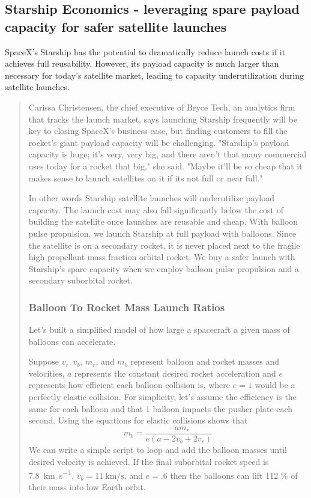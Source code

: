 \documentclass{article}
\begin{document}
\subsection{Starship Economics - leveraging spare payload capacity for safer satellite launches}
SpaceX’s Starship has the potential to dramatically reduce launch costs if it achieves full reusability. However, its payload capacity is much larger than necessary for today’s satellite market, leading to capacity underutilization during satellite launches.   \begin{quote}
Carissa Christensen, the chief executive of Bryce Tech, an analytics firm that tracks the launch market, says launching Starship frequently will be key to closing SpaceX’s business case, but finding customers to fill the rocket’s giant payload capacity will be challenging. 
"Starship's payload capacity is huge; it's very, very big, and there aren't that many commercial uses today for a rocket that big," she said.  "Maybe it'll be so cheap that it makes sense to launch satellites on it if its not full or near full." \cite{nyt_starship_size}

In other words Starship satellite launches will underutilize payload capacity.   The launch cost may also fall significantly below the cost of building the satellite once launches are reusable and cheap.   With balloon pulse propulsion, we launch Starship at full payload with balloons.   Since the satellite is on a secondary rocket, it is never placed next to the fragile high propellant mass fraction orbital rocket.   We buy a safer launch with Starship's spare capacity when we employ balloon pulse propulsion and a secondary suborbital rocket.

\subsubsection{Balloon To Rocket Mass Launch Ratios}\label{sec:balloon_rocket_ratio}
Let's built a simplified model of how large a spacecraft a given mass of balloons can accelerate.

Suppose \(v_r\)\,  \(v_b\),  \(m_r\), and \(m_b\) represent balloon and rocket masses and velocities,    \(a\) represents the constant desired rocket acceleration and \(e\) represents how efficient each balloon collision is, where \(e=1\) would be a perfectly elastic collision.   For simplicity, let's assume the efficiency is the same for each balloon and that 1 balloon impacts the pusher plate each second.   Using the equations for elastic collisions shows that 
\begin{equation}
m_b=\frac{-am_r}{e(a - 2v_b + 2v_r)}
\label{eq:balloon_mass}
\end{equation}
We can write a simple script to loop and add the balloon masses until desired velocity is achieved.   If the final suborbital rocket speed is \SI{7.8}{\kilo\metre\per\second}, \(v_b=\SI{11}{\kilo\metre\per\second}\), and \(e=.6\) then the balloons can lift 112 \% of their mass into low Earth orbit.   


\end{quote}
\end{document}
